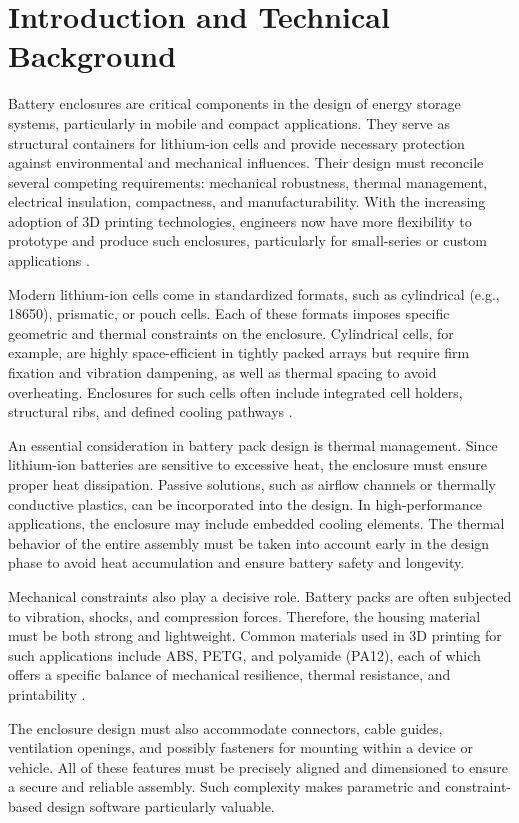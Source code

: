 \section{Introduction and Technical Background}
Battery enclosures are critical components in the design of energy storage systems, particularly in mobile and compact applications. They serve as structural containers for lithium-ion cells and provide necessary protection against environmental and mechanical influences. Their design must reconcile several competing requirements: mechanical robustness, thermal management, electrical insulation, compactness, and manufacturability. With the increasing adoption of 3D printing technologies, engineers now have more flexibility to prototype and produce such enclosures, particularly for small-series or custom applications \cite{gebhardt2016}.

Modern lithium-ion cells come in standardized formats, such as cylindrical (e.g., 18650), prismatic, or pouch cells. Each of these formats imposes specific geometric and thermal constraints on the enclosure. Cylindrical cells, for example, are highly space-efficient in tightly packed arrays but require firm fixation and vibration dampening, as well as thermal spacing to avoid overheating. Enclosures for such cells often include integrated cell holders, structural ribs, and defined cooling pathways \cite{pistoia2018}. 

An essential consideration in battery pack design is thermal management. Since lithium-ion batteries are sensitive to excessive heat, the enclosure must ensure proper heat dissipation. Passive solutions, such as airflow channels or thermally conductive plastics, can be incorporated into the design. In high-performance applications, the enclosure may include embedded cooling elements. The thermal behavior of the entire assembly must be taken into account early in the design phase to avoid heat accumulation and ensure battery safety and longevity.

Mechanical constraints also play a decisive role. Battery packs are often subjected to vibration, shocks, and compression forces. Therefore, the housing material must be both strong and lightweight. Common materials used in 3D printing for such applications include ABS, PETG, and polyamide (PA12), each of which offers a specific balance of mechanical resilience, thermal resistance, and printability \cite{gebhardt2016}.

The enclosure design must also accommodate connectors, cable guides, ventilation openings, and possibly fasteners for mounting within a device or vehicle. All of these features must be precisely aligned and dimensioned to ensure a secure and reliable assembly. Such complexity makes parametric and constraint-based design software particularly valuable.

